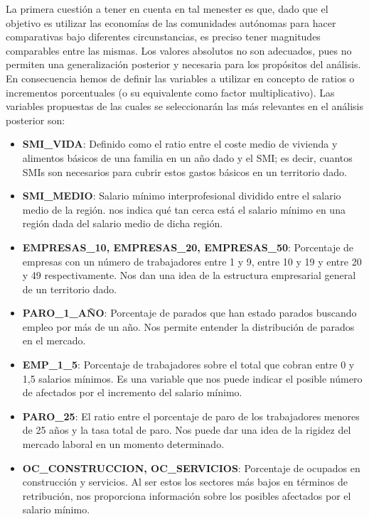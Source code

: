 \documentclass[11pt]{article}
\begin{document}
La primera cuestión a tener en cuenta en tal menester es que, dado que
el objetivo es utilizar las economías de las comunidades autónomas para
hacer comparativas bajo diferentes circunstancias, es preciso tener
magnitudes comparables entre las mismas. Los valores absolutos no son
adecuados, pues no permiten una generalización posterior y necesaria
para los propósitos del análisis. En consecuencia hemos de definir las
variables a utilizar en concepto de ratios o incrementos porcentuales (o
su equivalente como factor multiplicativo). Las variables propuestas de
las cuales se seleccionarán las más relevantes en el análisis posterior
son:

\begin{itemize}
\item
  \textbf{SMI\_VIDA}: Definido como el ratio entre el coste medio de
  vivienda y alimentos básicos de una familia en un año dado y el SMI;
  es decir, cuantos SMIs son necesarios para cubrir estos gastos básicos
  en un territorio dado.
\item
  \textbf{SMI\_MEDIO}: Salario mínimo interprofesional dividido entre el
  salario medio de la región. nos indica qué tan cerca está el salario
  mínimo en una región dada del salario medio de dicha región.
\item
  \textbf{EMPRESAS\_10, EMPRESAS\_20, EMPRESAS\_50}: Porcentaje de
  empresas con un número de trabajadores entre 1 y 9, entre 10 y 19 y
  entre 20 y 49 respectivamente. Nos dan una idea de la estructura
  empresarial general de un territorio dado.
\item
  \textbf{PARO\_1\_AÑO}: Porcentaje de parados que han estado parados
  buscando empleo por más de un año. Nos permite entender la
  distribución de parados en el mercado.
\item
  \textbf{EMP\_1\_5}: Porcentaje de trabajadores sobre el total que
  cobran entre 0 y 1,5 salarios mínimos. Es una variable que nos puede
  indicar el posible número de afectados por el incremento del salario
  mínimo.
\item
  \textbf{PARO\_25}: El ratio entre el porcentaje de paro de los
  trabajadores menores de 25 años y la tasa total de paro. Nos puede dar
  una idea de la rigidez del mercado laboral en un momento determinado.
\item
  \textbf{OC\_CONSTRUCCION, OC\_SERVICIOS}: Porcentaje de ocupados en
  construcción y servicios. Al ser estos los sectores más bajos en
  términos de retribución, nos proporciona información sobre los
  posibles afectados por el salario mínimo.
\end{itemize}
\end{document}
